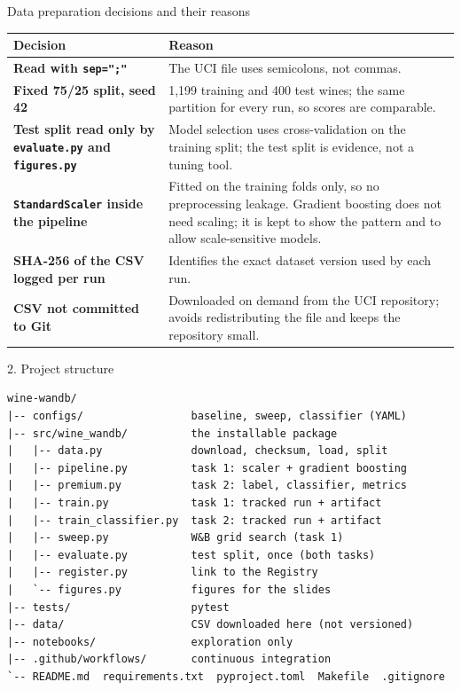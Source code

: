 \begin{frame}{Data preparation decisions and their reasons}
\begingroup\footnotesize
\begin{tabularx}{\textwidth}{>{\bfseries}p{3.2cm} X}
Decision & Reason \\
\toprule
Read with \texttt{sep=";"} & The UCI file uses semicolons, not commas. \\
\addlinespace[0.3em]
Fixed 75/25 split, seed 42 & 1{,}199 training and 400 test wines; the same partition for every run, so scores are comparable. \\
\addlinespace[0.3em]
Test split read only by \texttt{evaluate.py} and \texttt{figures.py} & Model selection uses cross-validation on the training split; the test split is evidence, not a tuning tool. \\
\addlinespace[0.3em]
\texttt{StandardScaler} inside the pipeline & Fitted on the training folds only, so no preprocessing leakage. Gradient boosting does not need scaling; it is kept to show the pattern and to allow scale-sensitive models. \\
\addlinespace[0.3em]
SHA-256 of the CSV logged per run & Identifies the exact dataset version used by each run. \\
\addlinespace[0.3em]
CSV not committed to Git & Downloaded on demand from the UCI repository; avoids redistributing the file and keeps the repository small. \\
\bottomrule
\end{tabularx}
\par\endgroup
\coursefooter
\end{frame}

\begin{frame}[fragile]{2. Project structure}
\begin{lstlisting}[language={}, basicstyle=\ttfamily\footnotesize, frame=single, rulecolor=\color{courseblue}, backgroundcolor=\color{codebg}, columns=fixed, keepspaces=true, xleftmargin=0.4em, xrightmargin=0.4em]
wine-wandb/
|-- configs/                 baseline, sweep, classifier (YAML)
|-- src/wine_wandb/          the installable package
|   |-- data.py              download, checksum, load, split
|   |-- pipeline.py          task 1: scaler + gradient boosting
|   |-- premium.py           task 2: label, classifier, metrics
|   |-- train.py             task 1: tracked run + artifact
|   |-- train_classifier.py  task 2: tracked run + artifact
|   |-- sweep.py             W&B grid search (task 1)
|   |-- evaluate.py          test split, once (both tasks)
|   |-- register.py          link to the Registry
|   `-- figures.py           figures for the slides
|-- tests/                   pytest
|-- data/                    CSV downloaded here (not versioned)
|-- notebooks/               exploration only
|-- .github/workflows/       continuous integration
`-- README.md  requirements.txt  pyproject.toml  Makefile  .gitignore
\end{lstlisting}
\coursefooter
\end{frame}

